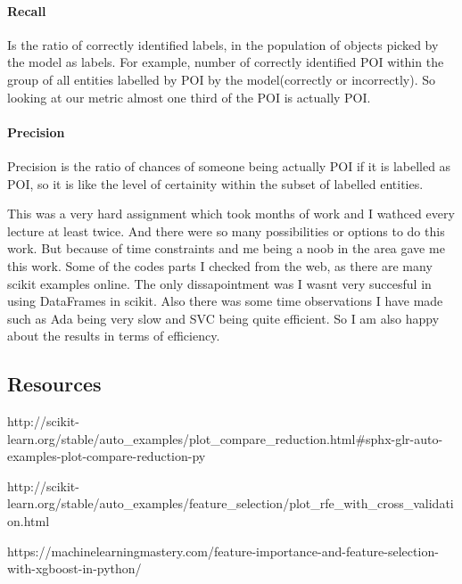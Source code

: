 \documentclass[11pt]{article}
\begin{document}
\paragraph{Recall}\label{recall}

Is the ratio of correctly identified labels, in the population of
objects picked by the model as labels. For example, number of correctly
identified POI within the group of all entities labelled by POI by the
model(correctly or incorrectly). So looking at our metric almost one
third of the POI is actually POI.

\paragraph{Precision}\label{precision}

Precision is the ratio of chances of someone being actually POI if it is
labelled as POI, so it is like the level of certainity within the subset
of labelled entities.

This was a very hard assignment which took months of work and I wathced
every lecture at least twice. And there were so many possibilities or
options to do this work. But because of time constraints and me being a
noob in the area gave me this work. Some of the codes parts I checked
from the web, as there are many scikit examples online. The only
dissapointment was I wasnt very succesful in using DataFrames in scikit.
Also there was some time observations I have made such as Ada being very
slow and SVC being quite efficient. So I am also happy about the results
in terms of efficiency.

    \subsection{Resources}\label{resources}

http://scikit-learn.org/stable/auto\_examples/plot\_compare\_reduction.html\#sphx-glr-auto-examples-plot-compare-reduction-py

http://scikit-learn.org/stable/auto\_examples/feature\_selection/plot\_rfe\_with\_cross\_validation.html

https://machinelearningmastery.com/feature-importance-and-feature-selection-with-xgboost-in-python/


    
    
    
    
\end{document}
